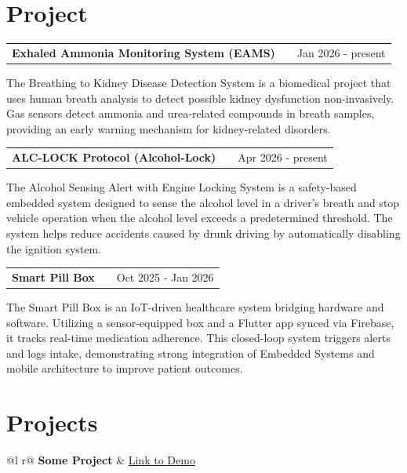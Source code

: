 \documentclass[a4paper,12pt]{article}
\makeatletter
\newenvironment{jobshort}[2]
    {
    \begin{tabularx}{\linewidth}{@{}l X r@{}}
    \textbf{#1} & \hfill &  #2 \\[3.75pt]
    \end{tabularx}
    }
    {
    }
\newenvironment{joblong}[2]
    {
    \begin{tabularx}{\linewidth}{@{}l X r@{}}
    \textbf{#1} & \hfill &  #2 \\[3.75pt]
    \end{tabularx}
    \begin{minipage}[t]{\linewidth}
    \begin{itemize}[nosep,after=\strut, leftmargin=1em, itemsep=3pt,label=--]
    }
    {
    \end{itemize}
    \end{minipage}    
    }
\makeatother
\begin{document}
\section{Project}

\begin{jobshort}{Exhaled Ammonia Monitoring System (EAMS)}{Jan 2026 - present}
The Breathing to Kidney Disease Detection System is a biomedical project that uses human breath analysis to detect possible kidney dysfunction non-invasively. Gas sensors detect ammonia and urea-related compounds in breath samples, providing an early warning mechanism for kidney-related disorders.
\end{jobshort}


\begin{joblong}{ALC-LOCK Protocol (Alcohol-Lock)}{Apr 2026 - present}
The Alcohol Sensing Alert with Engine Locking System is a safety-based embedded system designed to sense the alcohol level in a driver’s breath and stop vehicle operation when the alcohol level exceeds a predetermined threshold. The system helps reduce accidents caused by drunk driving by automatically disabling the ignition system.
\end{joblong}

\begin{joblong}{Smart Pill Box}{Oct 2025 - Jan 2026}
The Smart Pill Box is an IoT-driven healthcare system bridging hardware and software. Utilizing a sensor-equipped box and a Flutter app synced via Firebase, it tracks real-time medication adherence. This closed-loop system triggers alerts and logs intake, demonstrating strong integration of Embedded Systems and mobile architecture to improve patient outcomes.
\end{joblong}
\section{Projects}

\begin{tabularx}{\linewidth}{ @{}l r@{} }
\textbf{Some Project} & \hfill \href{https://some-link.com}{Link to Demo} \\[3.75pt]
  \\
\end{tabularx}
\end{document}
